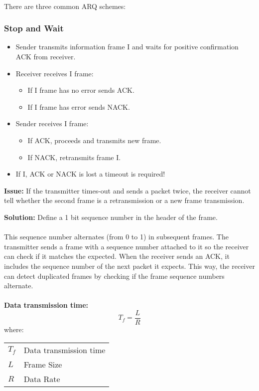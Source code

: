 \documentclass[../resumosRCOM.tex]{subfiles}
\makeatletter
\newenvironment{conditions}
  {\par\vspace{\abovedisplayskip}\noindent\begin{tabular}{>{$}l<{$} @{${}={}$} l}}
  {\end{tabular}\par\vspace{\belowdisplayskip}}
\makeatother
\begin{document}
\paragraph{}
There are three common ARQ schemes:

\subsubsection{Stop and Wait}
\begin{itemize}
    \item  Sender transmits information frame I and waits for positive confirmation
    ACK from receiver.
    \item Receiver receives I frame:
    \begin{itemize}
        \item If I frame has no error sends ACK.
        \item If I frame has error sends NACK.
    \end{itemize}
    \item Sender receives I frame:
    \begin{itemize}
        \item If ACK, proceeds and transmits new frame.
        \item If NACK, retransmits frame I.
    \end{itemize} 
    \item If I, ACK or NACK is lost a timeout is required!
\end{itemize}

\textbf{Issue:}
If the transmitter times-out and sends a packet twice, the receiver cannot tell whether
the second frame is a retransmission or a new frame transmission.

\textbf{Solution:}
Define a 1 bit sequence number in the header of the frame.

\paragraph{}
This sequence number alternates (from 0 to 1) in subsequent frames. The transmitter sends
a frame with a sequence number attached to it so the receiver can check if it matches the 
expected.  When the receiver sends an ACK, it includes the sequence number of the next 
packet it expects.  This way, the receiver can detect duplicated frames by checking if the
frame sequence numbers alternate.


\paragraph{}
\textbf{Data transmission time:}
\begin{equation}
    {T_f}=\frac{L}{R}
\end{equation}
where:
\begin{conditions}
    T_f    &  Data transmission time \\
   L     &   Frame Size\\
   R &  Data Rate 
\end{conditions}
\end{document}

